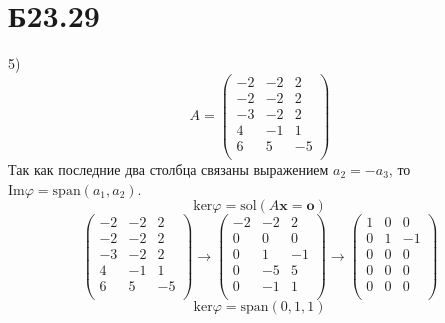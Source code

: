 \section*{Б23.29}5)
$$A=\begin{pmatrix*}
    -2&-2&2\\
    -2&-2&2\\
    -3&-2&2\\
    4&-1&1\\
    6&5&-5\\
\end{pmatrix*}$$
Так как последние два столбца связаны выражением $a_2=-a_3$, то $\mathrm{Im}\varphi=\mathrm{span}(a_1,a_2)$.
$$\mathrm{ker}\varphi=\mathrm{sol}(A\textbf{x}=\textbf{o})$$
$$\begin{pmatrix*}
    -2&-2&2\\
    -2&-2&2\\
    -3&-2&2\\
    4&-1&1\\
    6&5&-5\\
\end{pmatrix*}\rightarrow\begin{pmatrix*}
    -2&-2&2\\
    0&0&0\\
    0&1&-1\\
    0&-5&5\\
    0&-1&1\\
\end{pmatrix*}\rightarrow\begin{pmatrix*}
    1&0&0\\
    0&1&-1\\
    0&0&0\\
    0&0&0\\
    0&0&0\\
\end{pmatrix*}$$
$$\mathrm{ker}\varphi=\mathrm{span}(0,1,1)$$
